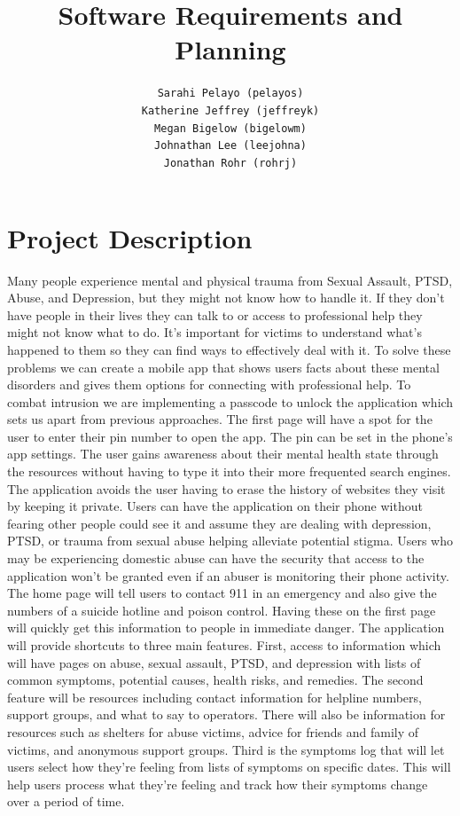 \documentclass[letterpaper,12pt,titlepage]{article}
\title{Software Requirements and Planning}
\author{
  \texttt{Sarahi Pelayo (pelayos)}
  \\[.5ex]
  \texttt{Katherine Jeffrey (jeffreyk)}
  \\[.5ex]
  \texttt{Megan Bigelow (bigelowm)}
  \\[.5ex]
  \texttt{Johnathan Lee (leejohna)}
  \\[.5ex]
  \texttt{Jonathan Rohr (rohrj)}
}
\begin{document}
\maketitle

\section{Project Description}
Many people experience mental and physical trauma from Sexual Assault, PTSD, Abuse, and Depression, but they might not know how to handle it. If they don’t have people in their lives they can talk to or access to professional help they might not know what to do. It’s important for victims to understand what’s happened to them so they can find ways to effectively deal with it. To solve these problems we can create a mobile app that shows users facts about these mental disorders and gives them options for connecting with professional help.
\newline
\newline
To combat intrusion we are implementing a passcode to unlock the application which sets us apart from previous approaches. The first page will have a spot for the user to enter their pin number to open the app. The pin can be set in the phone’s app settings. The user gains awareness about their mental health state through the resources without having to type it into their more frequented search engines. The application avoids the user having to erase the history of websites they visit by keeping it private. Users can have the application on their phone without fearing other people could see it and assume they are dealing with depression, PTSD, or trauma from sexual abuse helping alleviate potential stigma. Users who may be experiencing domestic abuse can have the security that access to the application won't be granted even if an abuser is monitoring their phone activity.
\newline
\newline
The home page will tell users to contact 911 in an emergency and also give the numbers of a suicide hotline and poison control. Having these on the first page will quickly get this information to people in immediate danger. The application will provide shortcuts to three main features. 
\newline
\newline
First, access to information which will have pages on abuse, sexual assault, PTSD, and depression with lists of common symptoms, potential causes, health risks, and remedies. The second feature will be resources including contact information for helpline  numbers, support groups, and what to say to operators. There will also be information for resources such as shelters for abuse victims, advice for friends and family of victims, and anonymous support groups. Third is the symptoms log that will let users select how they’re feeling from lists of symptoms on specific dates. This will help users process what they’re feeling and track how their symptoms change over a period of time.
\end{document}
